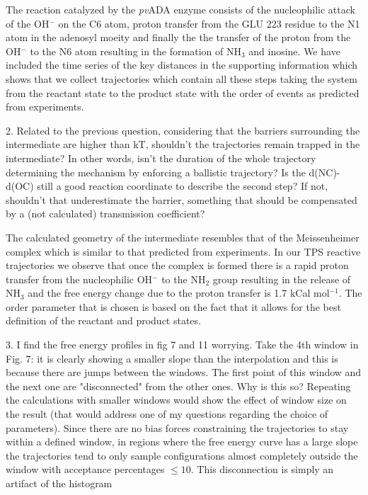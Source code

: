 \documentclass[journal=jpcbfk,manuscript=article,layout=traditional]{achemso}
\begin{document}
{\begin{response}
The reaction catalyzed by the \textit{pv}ADA enzyme consists of 
the nucleophilic attack of the OH$^{-}$ on the C6 atom, proton transfer from the 
GLU 223 residue to the N1 atom in the adenosyl moeity and finally the 
the transfer of the proton from the OH$^{-}$ to the N6 atom resulting in the formation 
of NH$_3$ and inosine. We have included the time series of the key distances in 
the supporting information which shows that we collect trajectories which contain all these
steps taking the system from the reactant state to the product state with the order of events
as predicted from experiments. 
\end{response}

\begin{response}{2. Related to the previous question, considering that the barriers 
surrounding the intermediate are higher than kT, shouldn't the trajectories remain 
trapped in the intermediate? In other words, isn't the duration of the whole trajectory 
determining the mechanism by enforcing a ballistic trajectory? Is the d(NC)-d(OC) still 
a good reaction coordinate to describe the second step? If not, shouldn't that underestimate 
the barrier, something that should be compensated by a (not calculated) transmission coefficient?}

The calculated geometry of the intermediate resembles that of the Meissenheimer complex which is
similar to that predicted from experiments. In our TPS reactive trajectories we observe that 
once the complex is formed there is a rapid proton transfer from the nucleophilic OH$^{-}$ 
to the NH$_2$ group resulting in the release of NH$_3$ and the free energy change due to the 
proton transfer is 1.7 kCal mol$^{-1}$. The order parameter that is chosen is based on the fact that
it allows for the best definition of the reactant and product states.    
\end{response}

\begin{response}
{3. I find the free energy profiles in fig 7 and 11 worrying. Take the 4th window in 
Fig. 7: it is clearly showing a smaller slope than the interpolation and this is because 
there are jumps between the windows. The first point of this window and the next one are 
"disconnected" from the other ones. Why is this so? Repeating the calculations with smaller 
windows would show the effect of window size on the result (that would address one of my 
questions regarding the choice of parameters).}
Since there are no bias forces constraining the trajectories to stay within a defined window, 
in regions where the free energy curve has a large slope the trajectories tend to only sample 
configurations almost completely outside the window with acceptance percentages $\leq 10$.
This disconnection is simply an artifact of the histogram 
\end{response}

}
\end{document}
